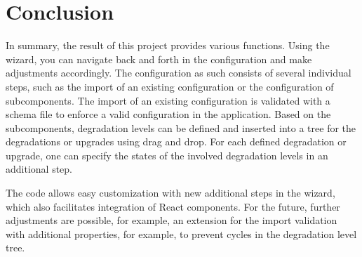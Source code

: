 \section{Conclusion}

In summary, the result of this project provides various functions. Using the wizard, you can navigate back and forth in the configuration and make adjustments accordingly. The configuration as such consists of several individual steps, such as the import of an existing configuration or the configuration of subcomponents. The import of an existing configuration is validated with a schema file to enforce a valid configuration in the application. Based on the subcomponents, degradation levels can be defined and inserted into a tree for the degradations or upgrades using drag and drop. For each defined degradation or upgrade, one can specify the states of the involved degradation levels in an additional step.

The code allows easy customization with new additional steps in the wizard, which also facilitates integration of React components. For the future, further adjustments are possible, for example, an extension for the import validation with additional properties, for example, to prevent cycles in the degradation level tree.  
